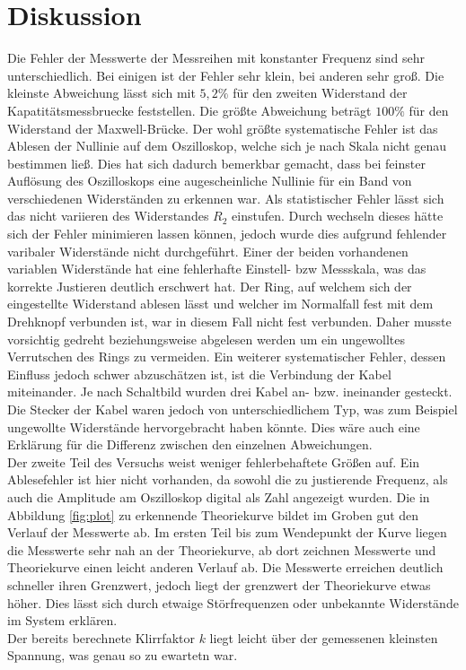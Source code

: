 \newpage
\section{Diskussion}
\label{sec:Diskussion}
\noindent
Die Fehler der Messwerte der Messreihen mit konstanter Frequenz sind sehr unterschiedlich.
Bei einigen ist der Fehler sehr klein, bei anderen sehr groß. Die kleinste Abweichung 
lässt sich mit $5,2\%$ für den zweiten Widerstand der Kapatitätsmessbruecke feststellen.
Die größte Abweichung beträgt $100\%$ für den Widerstand der Maxwell-Brücke. Der wohl größte 
systematische Fehler ist das Ablesen der Nullinie auf dem Oszilloskop, welche sich je nach Skala
nicht genau bestimmen ließ. Dies hat sich dadurch bemerkbar gemacht, dass bei feinster Auflösung des
Oszilloskops eine augescheinliche Nullinie für ein Band von verschiedenen Widerständen zu erkennen war.
Als statistischer Fehler lässt sich das nicht variieren des Widerstandes $R_2$ einstufen. 
Durch wechseln dieses hätte sich der Fehler minimieren lassen können, jedoch wurde dies
aufgrund fehlender varibaler Widerstände nicht durchgeführt. Einer der beiden vorhandenen variablen 
Widerstände hat eine fehlerhafte Einstell- bzw Messskala, was das korrekte Justieren deutlich erschwert hat.
Der Ring, auf welchem sich der eingestellte Widerstand ablesen lässt und welcher im Normalfall fest mit dem
Drehknopf verbunden ist, war in diesem Fall nicht fest verbunden. Daher musste vorsichtig gedreht 
beziehungsweise abgelesen werden um ein ungewolltes Verrutschen des Rings zu vermeiden. 
Ein weiterer systematischer Fehler, dessen Einfluss jedoch schwer abzuschätzen ist, ist die Verbindung 
der Kabel miteinander. Je nach Schaltbild wurden drei Kabel an- bzw. ineinander gesteckt. Die Stecker der 
Kabel waren jedoch von unterschiedlichem Typ, was zum Beispiel ungewollte Widerstände hervorgebracht 
haben könnte. Dies wäre auch eine Erklärung für die Differenz zwischen den einzelnen Abweichungen.\\ \noindent
Der zweite Teil des Versuchs weist weniger fehlerbehaftete Größen auf. Ein Ablesefehler ist hier nicht vorhanden, da 
sowohl die zu justierende Frequenz, als auch die Amplitude am Oszilloskop digital als Zahl angezeigt wurden.
Die in Abbildung \ref{fig:plot} zu erkennende Theoriekurve bildet im Groben gut den Verlauf der Messwerte ab.
Im ersten Teil bis zum Wendepunkt der Kurve liegen die Messwerte sehr nah an der Theoriekurve, ab dort zeichnen
Messwerte und Theoriekurve einen leicht anderen Verlauf ab. Die Messwerte erreichen deutlich schneller ihren 
Grenzwert, jedoch liegt der grenzwert der Theoriekurve etwas höher. Dies lässt sich durch etwaige Störfrequenzen 
oder unbekannte Widerstände im System erklären. \\ \noindent
Der bereits berechnete Klirrfaktor $k$ liegt leicht über der gemessenen kleinsten Spannung, was genau so zu 
ewartetn war.